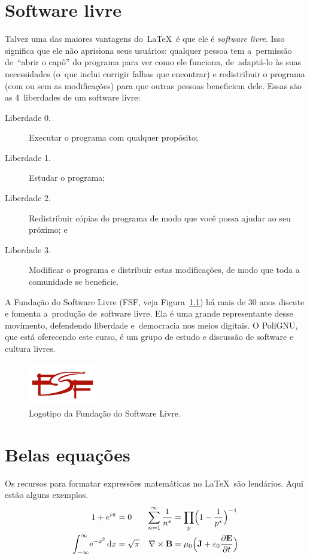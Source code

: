 \documentclass[a5paper,11pt,article,oneside]{memoir}
\let\velhoEmph\emph
\renewcommand{\emph}[1]{\textcolor{blue!80!black}{\velhoEmph{#1}}}
\begin{document}
\chapter{Software livre}

Talvez uma das maiores vantagens do~\LaTeX\ é que ele é
\emph{software livre}. Isso significa que ele não aprisiona seus usuários:
qualquer pessoa tem a~permissão de~``abrir o capô'' do programa 
para ver como ele funciona, de~adaptá-lo às suas necessidades (o~que 
inclui corrigir falhas que encontrar) e redistribuir o programa (com ou sem
as modificações) para que outras pessoas beneficiem dele. Essas são
as 4~liberdades de um software livre:


\begin{description}
\item[\small Liberdade 0.] Executar o programa com qualquer propósito;
\item[\small Liberdade 1.] Estudar o programa;
\item[\small Liberdade 2.] Redistribuir cópias do programa de modo que você possa ajudar ao seu próximo; e
\item[\small Liberdade 3.] Modificar o programa e distribuir estas modificações, de modo que toda a comunidade se beneficie.
\end{description}
A Fundação do Software Livre (FSF, veja Figura~\ref{fig:logo-fsf})
há mais de 30 anos discute e fomenta a~produção
de~software livre. Ela é uma grande representante desse movimento,
defendendo liberdade e~democracia nos meios digitais.
O PoliGNU, que está oferecendo este curso, é um grupo de estudo 
e discussão de software e cultura livres.

\begin{figure}
\centering
\includegraphics[width=3cm]{FSF_logo_menor}%
\caption{Logotipo da Fundação do Software Livre.}\label{fig:logo-fsf}
\end{figure}

\chapter{Belas equações}

Os recursos para formatar expressões matemáticas no \LaTeX\ são lendários.
Aqui estão alguns exemplos.
\begin{align*}
1 + e^{i\pi}& =0 
& \sum_{n=1}^\infty \frac{1}{n^s} &= \prod_p\Bigl(1-\frac{1}{p^s}\Bigr)^{-1}\\
\int_{-\infty}^\infty \!\mathrm{e}^{-x^2}\,\mathrm{d}x &=\sqrt{\pi} &
\nabla \times\mathbf{B}&=\mu_0\Bigl(\mathbf{J}+\varepsilon_0\frac{\partial\mathbf{E}}{\partial t}\Bigr)
\end{align*}
\end{document}
